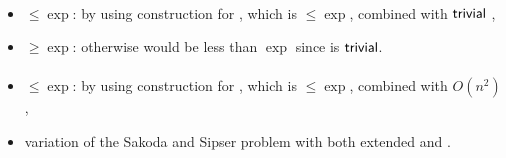 \paragraph{\OLA{}\tto\TNFA}
\begin{itemize}
	\item $\le\exp$: by using construction for \hyperref[cost:1LAto1NFAu]{\OLA{}\tto\ONFA}, which is $\le\exp$, combined with $\mathsf{trivial}$ \ONFA{}\tto\TNFA,
	\item $\ge\exp$: otherwise \hyperref[cost:1DLAto2NFAu]{\ODLA{}\tto\TNFA} would be less than $\exp$ since \ODLA{}\tto\OLA is $\mathsf{trivial}$.
\end{itemize}
\paragraph{\OLA{}\tto\ODLA}
\begin{itemize}
	\item $\le\exp$: by using construction for \hyperref[cost:1LAto1NFAu]{\OLA{}\tto\ONFA}, which is $\le\exp$, combined with $O(n^2)$ \hyperref[cost:1NFAto1DLAu]{\ONFA{}\tto\ODLA},
	\item variation of the Sakoda and Sipser problem with both extended \TNFA and \TDFA.
\end{itemize}


